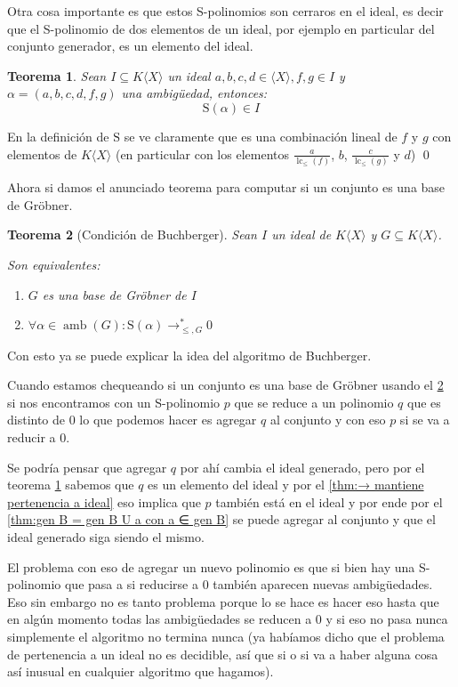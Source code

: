 \documentclass{report}
\theoremstyle{customstyle}
\newtheorem{theorem}{Teorema}[chapter]
\renewenvironment{proof}[1][\proofname]{{\bfseries #1: }}{\qed} %
\theoremstyle{factstyle}
\DeclareMathOperator{\lc}{lc}
\DeclareMathOperator{\amb}{amb}
\renewcommand{\S}{\text{S}}
\begin{document}
Otra cosa importante es que estos S-polinomios son cerraros en el ideal, es decir que el S-polinomio de dos elementos de un ideal, por ejemplo en particular del conjunto generador, es un elemento del ideal.

\begin{theorem}\label{thm:S es cerrado en ideal}
  Sean $I ⊆ K⟨X⟩$ un ideal $a, b, c, d ∈ ⟨X⟩, f, g ∈ I$ y $α = (a, b, c, d, f, g)$ una ambigüedad, entonces:
  \[ \S(α) ∈ I \]
\end{theorem}
  \begin{proof}
  En la definición de $\S$ se ve claramente que es una combinación lineal de $f$ y $g$ con elementos de $K⟨X⟩$ (en particular con los elementos $\frac{a}{\lc_≤{(f)}}$, $b$, $\frac{c}{\lc_≤{(g)}}$ y $d$)
\end{proof}

Ahora si damos el anunciado teorema para computar si un conjunto es una base de Gröbner.

\begin{theorem}[Condición de Buchberger]\label{thm:condición de Buchberger)}
  Sean $I$ un ideal de $K⟨X⟩$ y $G ⊆ K⟨X⟩$.

  Son equivalentes:
  \begin{enumerate}
    \item $G$ es una base de Gröbner de $I$
    \item $∀α ∈ \amb(G) : \S(α) →^*_{≤, G} 0$
  \end{enumerate}
\end{theorem}

Con esto ya se puede explicar la idea del algoritmo de Buchberger.

Cuando estamos chequeando si un conjunto es una base de Gröbner usando el \cref{thm:condición de Buchberger)} si nos encontramos con un S-polinomio $p$ que se reduce a un polinomio $q$ que es distinto de $0$ lo que podemos hacer es agregar $q$ al conjunto y con eso $p$ si se va a reducir a $0$.

Se podría pensar que agregar $q$ por ahí cambia el ideal generado, pero por el teorema \cref{thm:S es cerrado en ideal} sabemos que $q$ es un elemento del ideal y por el \cref{thm:→ mantiene pertenencia a ideal} eso implica que $p$ también está en el ideal y por ende por el \cref{thm:gen B = gen B U a con a ∈ gen B} se puede agregar al conjunto y que el ideal generado siga siendo el mismo.

El problema con eso de agregar un nuevo polinomio es que si bien hay una S-polinomio que pasa a si reducirse a $0$ también aparecen nuevas ambigüedades. Eso sin embargo no es tanto problema porque lo se hace es hacer eso hasta que en algún momento todas las ambigüedades se reducen a $0$ y si eso no pasa nunca simplemente el algoritmo no termina nunca (ya habíamos dicho que el problema de pertenencia a un ideal no es decidible, así que si o si va a haber alguna cosa así inusual en cualquier algoritmo que hagamos).
\end{document}
